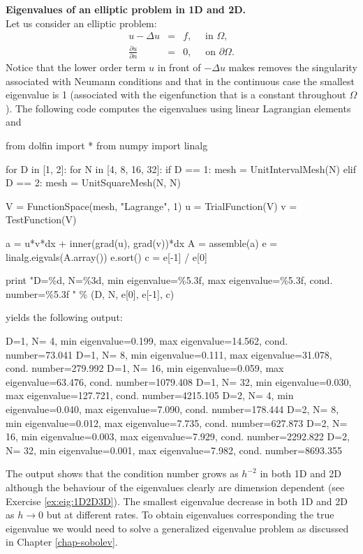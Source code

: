 \begin{example}{\textbf{Eigenvalues of an elliptic problem in 1D and 2D.}} \\
Let us consider an elliptic problem: 
\begin{eqnarray}
u - \Delta u &=& f, \quad \text{ in } \Omega, \\     
\frac{\partial u}{\partial n} &=& 0, \quad \text{ on } \partial \Omega .  
\end{eqnarray}
Notice that the lower order term $u$ in front of $-\Delta u$ makes removes
the singularity associated with Neumann conditions and that in the continuous
case the smallest eigenvalue is 1 (associated with the eigenfunction that is a constant throughout $\Omega$). 
The following code computes the eigenvalues using 
linear Lagrangian elements and  
\begin{python}
from dolfin import *
from numpy import linalg 

for D in [1, 2]: 
  for N in [4, 8, 16, 32]:
    if   D == 1:  mesh = UnitIntervalMesh(N)
    elif D == 2:  mesh = UnitSquareMesh(N, N)

    V = FunctionSpace(mesh, "Lagrange", 1)
    u = TrialFunction(V)
    v = TestFunction(V)

    a = u*v*dx  + inner(grad(u), grad(v))*dx  
    A = assemble(a) 
    e = linalg.eigvals(A.array()) 
    e.sort()
    c = e[-1] / e[0]

    print "D=\%d, N=\%3d, min eigenvalue=\%5.3f, max eigenvalue=\%5.3f, cond. number=\%5.3f " \% (D, N, e[0], e[-1], c) 
\end{python}
yields the following output:  
\begin{progoutput}
D=1, N=  4, min eigenvalue=0.199, max eigenvalue=14.562,  cond. number=73.041 
D=1, N=  8, min eigenvalue=0.111, max eigenvalue=31.078,  cond. number=279.992 
D=1, N= 16, min eigenvalue=0.059, max eigenvalue=63.476,  cond. number=1079.408 
D=1, N= 32, min eigenvalue=0.030, max eigenvalue=127.721, cond. number=4215.105 
D=2, N=  4, min eigenvalue=0.040, max eigenvalue=7.090,   cond. number=178.444 
D=2, N=  8, min eigenvalue=0.012, max eigenvalue=7.735,   cond. number=627.873 
D=2, N= 16, min eigenvalue=0.003, max eigenvalue=7.929,   cond. number=2292.822 
D=2, N= 32, min eigenvalue=0.001, max eigenvalue=7.982,   cond. number=8693.355 
\end{progoutput}
The output shows that the condition number grows as $h^{-2}$ in both 1D and 2D although
the behaviour of the eigenvalues clearly are dimension dependent (see Exercise \ref{ex:eig:1D2D3D}). The smallest eigenvalue decrease in both 1D and 2D as $h\rightarrow 0$ but at different rates. To obtain eigenvalues corresponding the
true eigenvalue we would need to solve a generalized eigenvalue problem 
as discussed in Chapter \ref{chap-sobolev}.           
\end{example}



